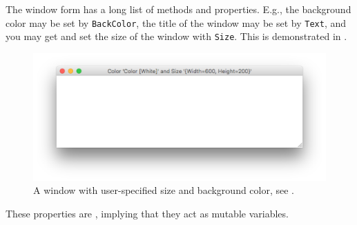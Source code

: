 \documentclass[fsharpnotes.tex]{subfiles}
\begin{document}
The window form has a long list of methods and properties. E.g., the background color may be set by \lstinline!BackColor!, the title of the window may be set by \lstinline!Text!, and you may get and set the size of the window with \lstinline!Size!. This is demonstrated in .
%
%
\begin{figure}
  \centering
  \includegraphics[scale=0.3]{windowProperty}
  \caption{A window with user-specified size and background color, see .}
  \label{fig:windowProperty}
\end{figure}
%
These properties are , implying that they act as mutable variables. 
\end{document}
